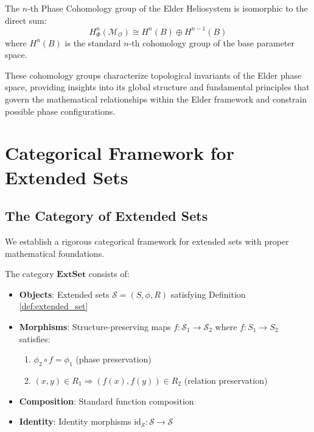 \begin{theorem}
\begin{definition}
\begin{definition}
\begin{enumerate}
\begin{definition}
\begin{theorem}
The $n$-th Phase Cohomology group of the Elder Heliosystem is isomorphic to the direct sum:
\begin{equation}
H^n_{\Phi}(\mathcal{M}_{\mathcal{O}}) \cong H^n(B) \oplus H^{n-1}(B)
\end{equation}
where $H^n(B)$ is the standard $n$-th cohomology group of the base parameter space.
\end{theorem}

These cohomology groups characterize topological invariants of the Elder phase space, providing insights into its global structure and fundamental principles that govern the mathematical relationships within the Elder framework and constrain possible phase configurations.

\section{Categorical Framework for Extended Sets}

\subsection{The Category of Extended Sets}

We establish a rigorous categorical framework for extended sets with proper mathematical foundations.

\begin{definition}
\label{def:category_extset}
The category $\mathbf{ExtSet}$ consists of:
\begin{itemize}
    \item \textbf{Objects}: Extended sets $\mathcal{S} = (S, \phi, R)$ satisfying Definition \ref{def:extended_set}
    \item \textbf{Morphisms}: Structure-preserving maps $f: \mathcal{S}_1 \to \mathcal{S}_2$ where $f: S_1 \to S_2$ satisfies:
    \begin{enumerate}
        \item $\phi_2 \circ f = \phi_1$ (phase preservation)
        \item $(x,y) \in R_1 \Rightarrow (f(x), f(y)) \in R_2$ (relation preservation)
    \end{enumerate}
    \item \textbf{Composition}: Standard function composition
    \item \textbf{Identity}: Identity morphisms $\text{id}_{\mathcal{S}}: \mathcal{S} \to \mathcal{S}$
\end{itemize}
\end{definition}


\end{definition}
\end{enumerate}
\end{definition}
\end{definition}
\end{theorem}
